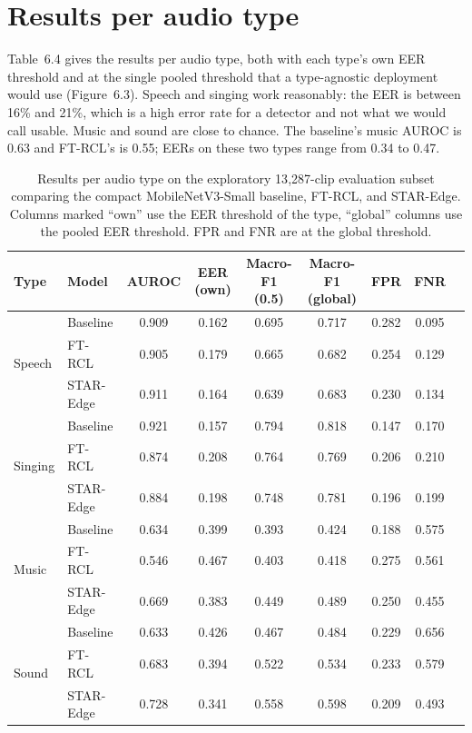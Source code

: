 \documentclass[12pt,a4paper]{report}
\begin{document}
\section{Results per audio type}
\label{sec:per-type}

Table~6.4 gives the results per audio type, both with each type's own EER threshold and at the single pooled threshold that a type-agnostic deployment would use (Figure~6.3). Speech and singing work reasonably: the EER is between 16\% and 21\%, which is a high error rate for a detector and not what we would call usable. Music and sound are close to chance. The baseline's music AUROC is 0.63 and FT-RCL's is 0.55; EERs on these two types range from 0.34 to 0.47.

\begin{table}[htbp]
\centering
\caption{Results per audio type on the exploratory 13{,}287-clip evaluation subset comparing the compact MobileNetV3-Small baseline, FT-RCL, and STAR-Edge. Columns marked ``own'' use the EER threshold of the type, ``global'' columns use the pooled EER threshold. FPR and FNR are at the global threshold.}
\label{tab:type}
\small
\setlength{\tabcolsep}{3.5pt}

\begin{tabular}{@{}llccccccc@{}}
\toprule
Type & Model & AUROC & EER (own) & Macro-F1 (0.5) & Macro-F1 (global) & FPR & FNR \\
\midrule
\multirow{3}{*}{Speech}  & Baseline & 0.909 & 0.162 & 0.695 & 0.717 & 0.282 & 0.095 \\
 & FT-RCL & 0.905 & 0.179 & 0.665 & 0.682 & 0.254 & 0.129 \\
 & STAR-Edge & 0.911 & 0.164 & 0.639 & 0.683 & 0.230 & 0.134 \\
\midrule
\multirow{3}{*}{Singing} & Baseline & 0.921 & 0.157 & 0.794 & 0.818 & 0.147 & 0.170 \\
 & FT-RCL & 0.874 & 0.208 & 0.764 & 0.769 & 0.206 & 0.210 \\
 & STAR-Edge & 0.884 & 0.198 & 0.748 & 0.781 & 0.196 & 0.199 \\
\midrule
\multirow{3}{*}{Music}   & Baseline & 0.634 & 0.399 & 0.393 & 0.424 & 0.188 & 0.575 \\
 & FT-RCL & 0.546 & 0.467 & 0.403 & 0.418 & 0.275 & 0.561 \\
 & STAR-Edge & 0.669 & 0.383 & 0.449 & 0.489 & 0.250 & 0.455 \\
\midrule
\multirow{3}{*}{Sound}   & Baseline & 0.633 & 0.426 & 0.467 & 0.484 & 0.229 & 0.656 \\
 & FT-RCL & 0.683 & 0.394 & 0.522 & 0.534 & 0.233 & 0.579 \\
 & STAR-Edge & 0.728 & 0.341 & 0.558 & 0.598 & 0.209 & 0.493 \\
\bottomrule
\end{tabular}

\end{table}
\end{document}
